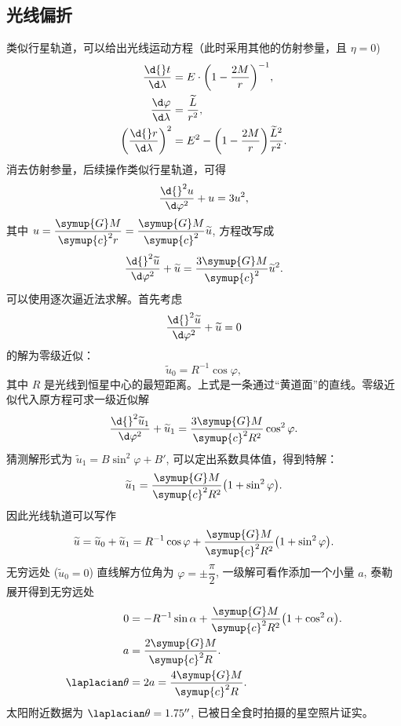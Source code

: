 \documentclass[UTF8, 12pt, a4paper, oneside, onecolumn, fontset=none]{ctexart}
\begin{document}
\subsection{光线偏折}
类似行星轨道，可以给出光线运动方程（此时采用其他的仿射参量，且 $\eta=0$)
\begin{align}
\frac{\d{}t}{\d\lambda}&=E\cdot\mleft(1-\frac{2M}{r}\mright)^{-1},\\
\frac{\d\varphi}{\d\lambda}&=\frac{\widetilde{L}}{r^{2}},\\
\mleft(\frac{\d{}r}{\d\lambda}\mright)^{2}&=E^{2}-\mleft(1-\frac{2M}{r}\mright)\frac{\widetilde{L}^{2}}{r^{2}}.
\end{align}
消去仿射参量，后续操作类似行星轨道，可得
\begin{equation}
\frac{\d{}^{2}u}{\d\varphi^{2}}+u=3u^{2},
\end{equation}
其中 $u=\dfrac{\symup{G}M}{\symup{c}^{2}r}=\dfrac{\symup{G}M}{\symup{c}^{2}}\widetilde{u}$, 方程改写成
\begin{equation}
\frac{\d{}^{2}\widetilde{u}}{\d\varphi^{2}}+\widetilde{u}=\frac{3\symup{G}M}{\symup{c}^{2}}\widetilde{u}^{2}.
\end{equation}
可以使用逐次逼近法求解。首先考虑
\begin{equation}
\frac{\d{}^{2}\widetilde{u}}{\d\varphi^{2}}+\widetilde{u}=0
\end{equation}
的解为零级近似：
\begin{equation}
\widetilde{u}_{0}=R^{-1}\cos{\varphi},
\end{equation}
其中 $R$ 是光线到恒星中心的最短距离。上式是一条通过“黄道面”的直线。零级近似代入原方程可求一级近似解
\begin{equation}
\frac{\d{}^{2}\widetilde{u}_{1}}{\d\varphi^{2}}+\widetilde{u}_{1}=\frac{3\symup{G}M}{\symup{c}^{2}R^{2}}\cos^{2}{\varphi}.
\end{equation}
猜测解形式为 $\widetilde{u}_{1}=B\sin^{2}{\varphi}+B'$, 可以定出系数具体值，得到特解：
\begin{equation}
\widetilde{u}_{1}=\frac{\symup{G}M}{\symup{c}^{2}R^{2}}\mleft(1+\sin^{2}{\varphi}\mright).
\end{equation}
因此光线轨道可以写作
\begin{equation}
\widetilde{u}=\widetilde{u}_{0}+\widetilde{u}_{1}=R^{-1}\cos{\varphi}+\frac{\symup{G}M}{\symup{c}^{2}R^{2}}\mleft(1+\sin^{2}{\varphi}\mright).
\end{equation}
无穷远处 ($\widetilde{u}_{0}=0$) 直线解方位角为 $\varphi=\pm\dfrac{\pi}{2}$, 一级解可看作添加一个小量 $a$, 泰勒展开得到无穷远处
\begin{align}
0&=-R^{-1}\sin{\alpha}+\frac{\symup{G}M}{\symup{c}^{2}R^{2}}\mleft(1+\cos^{2}{\alpha}\mright).\\
a&=\frac{2\symup{G}M}{\symup{c}^{2}R}.\\
\laplacian\theta&=2a=\frac{4\symup{G}M}{\symup{c}^{2}R}.
\end{align}
太阳附近数据为 $\laplacian\theta=\ang{;; 1.75}$, 已被日全食时拍摄的星空照片证实。

\end{document}
